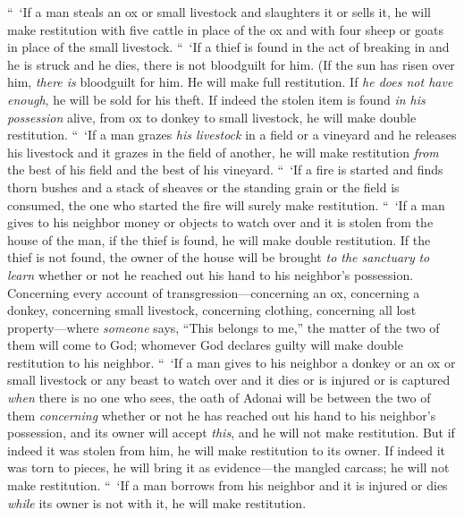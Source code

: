 \begin{biblechapter} %
  “ ‘If a man steals an ox or small livestock and slaughters it or sells it, he will make restitution with five cattle in place of the ox and with four sheep or goats in place of the small livestock.
\verse “ ‘If a thief is found in the act of breaking in and he is struck and he dies, there is not bloodguilt for him.
\verse (If the sun has risen over him, \textit{there is} bloodguilt for him. He will make full restitution. If \textit{he does not have enough}, he will be sold for his theft.
\verse If indeed the stolen item is found \textit{in his possession} alive, from ox to donkey to small livestock, he will make double restitution.
\verse “ ‘If a man grazes \textit{his livestock} in a field or a vineyard and he releases his livestock and it grazes in the field of another, he will make restitution \textit{from} the best of his field and the best of his vineyard.
\verse “ ‘If a fire is started and finds thorn bushes and a stack of sheaves or the standing grain or the field is consumed, the one who started the fire will surely make restitution.
\verse “ ‘If a man gives to his neighbor money or objects to watch over and it is stolen from the house of the man, if the thief is found, he will make double restitution.
\verse If the thief is not found, the owner of the house will be brought \textit{to the sanctuary} \textit{to learn} whether or not he reached out his hand to his neighbor’s possession.
\verse Concerning every account of transgression—concerning an ox, concerning a donkey, concerning small livestock, concerning clothing, concerning all lost property—where \textit{someone} says, “This belongs to me,” the matter of the two of them will come to God; whomever God declares guilty will make double restitution to his neighbor.
\verse “ ‘If a man gives to his neighbor a donkey or an ox or small livestock or any beast to watch over and it dies or is injured or is captured \textit{when} there is no one who sees,
\verse the oath of Adonai will be between the two of them \textit{concerning} whether or not he has reached out his hand to his neighbor’s possession, and its owner will accept \textit{this}, and he will not make restitution.
\verse But if indeed it was stolen from him, he will make restitution to its owner.
\verse If indeed it was torn to pieces, he will bring it as evidence—the mangled carcass; he will not make restitution.
\verse “ ‘If a man borrows from his neighbor and it is injured or dies \textit{while} its owner is not with it, he will make restitution.

\end{biblechapter}
